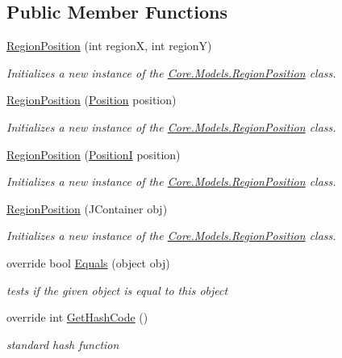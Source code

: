 \subsection*{Public Member Functions}
\begin{DoxyCompactItemize}
\item 
\hyperlink{classCore_1_1Models_1_1RegionPosition_ae02aba3016ef1e1eca5b3283bbd6068b}{Region\+Position} (int region\+X, int region\+Y)
\begin{DoxyCompactList}\small\item\em Initializes a new instance of the \hyperlink{classCore_1_1Models_1_1RegionPosition}{Core.\+Models.\+Region\+Position} class. \end{DoxyCompactList}\item 
\hyperlink{classCore_1_1Models_1_1RegionPosition_a79f52954eeec48c9a5b06fd0a6ec9053}{Region\+Position} (\hyperlink{classCore_1_1Models_1_1Position}{Position} position)
\begin{DoxyCompactList}\small\item\em Initializes a new instance of the \hyperlink{classCore_1_1Models_1_1RegionPosition}{Core.\+Models.\+Region\+Position} class. \end{DoxyCompactList}\item 
\hyperlink{classCore_1_1Models_1_1RegionPosition_a09edc96dddc599eedf2980effb36956a}{Region\+Position} (\hyperlink{classCore_1_1Models_1_1PositionI}{Position\+I} position)
\begin{DoxyCompactList}\small\item\em Initializes a new instance of the \hyperlink{classCore_1_1Models_1_1RegionPosition}{Core.\+Models.\+Region\+Position} class. \end{DoxyCompactList}\item 
\hyperlink{classCore_1_1Models_1_1RegionPosition_a120da8d2e0832f8a3c3b12f4e610d10c}{Region\+Position} (J\+Container obj)
\begin{DoxyCompactList}\small\item\em Initializes a new instance of the \hyperlink{classCore_1_1Models_1_1RegionPosition}{Core.\+Models.\+Region\+Position} class. \end{DoxyCompactList}\item 
override bool \hyperlink{classCore_1_1Models_1_1RegionPosition_a3ad7a93b164a4e9459a148c97726f557}{Equals} (object obj)
\begin{DoxyCompactList}\small\item\em tests if the given object is equal to this object \end{DoxyCompactList}\item 
override int \hyperlink{classCore_1_1Models_1_1RegionPosition_ac39a779696243b79152ebde4f3029738}{Get\+Hash\+Code} ()
\begin{DoxyCompactList}\small\item\em standard hash function \end{DoxyCompactList}\end{DoxyCompactItemize}
